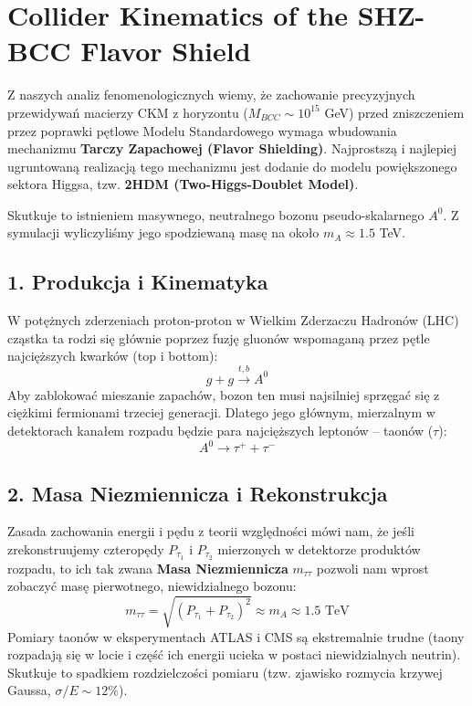 \documentclass[11pt,a4paper]{article}
\begin{document}
\section*{Collider Kinematics of the SHZ-BCC Flavor Shield}

Z naszych analiz fenomenologicznych wiemy, że zachowanie precyzyjnych przewidywań macierzy CKM z horyzontu ($M_{BCC} \sim 10^{15}$ GeV) przed zniszczeniem przez poprawki pętlowe Modelu Standardowego wymaga wbudowania mechanizmu \textbf{Tarczy Zapachowej (Flavor Shielding)}. Najprostszą i najlepiej ugruntowaną realizacją tego mechanizmu jest dodanie do modelu powiększonego sektora Higgsa, tzw. \textbf{2HDM (Two-Higgs-Doublet Model)}.

Skutkuje to istnieniem masywnego, neutralnego bozonu pseudo-skalarnego $A^0$. Z symulacji wyliczyliśmy jego spodziewaną masę na około $m_A \approx 1.5$ TeV.

\subsection*{1. Produkcja i Kinematyka}
W potężnych zderzeniach proton-proton w Wielkim Zderzaczu Hadronów (LHC) cząstka ta rodzi się głównie poprzez fuzję gluonów wspomaganą przez pętle najcięższych kwarków (top i bottom):
\begin{equation}
    g + g \xrightarrow{t, b} A^0
\end{equation}
Aby zablokować mieszanie zapachów, bozon ten musi najsilniej sprzęgać się z ciężkimi fermionami trzeciej generacji. Dlatego jego głównym, mierzalnym w detektorach kanałem rozpadu będzie para najcięższych leptonów -- taonów ($\tau$):
\begin{equation}
    A^0 \to \tau^+ + \tau^-
\end{equation}

\subsection*{2. Masa Niezmiennicza i Rekonstrukcja}
Zasada zachowania energii i pędu z teorii względności mówi nam, że jeśli zrekonstruujemy czteropędy $P_{\tau_1}$ i $P_{\tau_2}$ mierzonych w detektorze produktów rozpadu, to ich tak zwana \textbf{Masa Niezmiennicza} $m_{\tau\tau}$ pozwoli nam wprost zobaczyć masę pierwotnego, niewidzialnego bozonu:
\begin{equation}
    m_{\tau\tau} = \sqrt{(P_{\tau_1} + P_{\tau_2})^2} \approx m_A \approx 1.5 \text{ TeV}
\end{equation}
Pomiary taonów w eksperymentach ATLAS i CMS są ekstremalnie trudne (taony rozpadają się w locie i część ich energii ucieka w postaci niewidzialnych neutrin). Skutkuje to spadkiem rozdzielczości pomiaru (tzw. zjawisko rozmycia krzywej Gaussa, $\sigma/E \sim 12\%$). 
\end{document}
